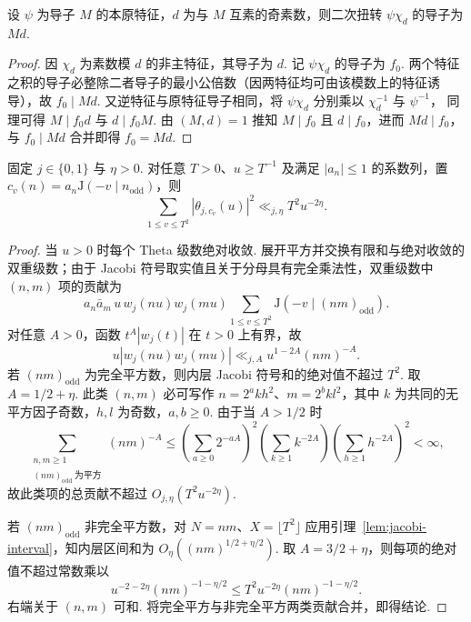 \begin{lemma}[互素导子的本原二次扭转]
\label{lem:twist-primitivity}
\emitthmsource
设 $\psi$ 为导子 $M$ 的本原特征，$d$ 为与 $M$ 互素的奇素数，则二次扭转 $\psi\chi_d$ 的导子为 $Md$.
\end{lemma}
\begin{proof}
因 $\chi_d$ 为素数模 $d$ 的非主特征，其导子为 $d$.
记 $\psi\chi_d$ 的导子为 $f_0$.
两个特征之积的导子必整除二者导子的最小公倍数（因两特征均可由该模数上的特征诱导），故 $f_0\mid Md$.
又逆特征与原特征导子相同，将 $\psi\chi_d$ 分别乘以 $\chi_d^{-1}$ 与 $\psi^{-1}$，
同理可得 $M\mid f_0d$ 与 $d\mid f_0M$.
由 $(M,d)=1$ 推知 $M\mid f_0$ 且 $d\mid f_0$，进而 $Md\mid f_0$，与 $f_0\mid Md$ 合并即得 $f_0=Md$.
\end{proof}

\begin{lemma}
\label{lem:theta-second-moment}
\emitthmsource
固定 $j\in\{0,1\}$ 与 $\eta>0$. 对任意 $T>0$、$u\ge T^{-1}$ 及满足 $|a_n|\le1$ 的系数列，置 $c_v(n)=a_n\mathrm J(-v\mid n_{\mathrm{odd}})$，则
\[
 \sum_{1\le v\le T^2}|\theta_{j,c_v}(u)|^2\ll_{j,\eta} T^2u^{-2\eta}.
\]
\end{lemma}
\begin{proof}
当 $u>0$ 时每个 Theta 级数绝对收敛. 展开平方并交换有限和与绝对收敛的双重级数；由于 Jacobi 符号取实值且关于分母具有完全乘法性，双重级数中 $(n,m)$ 项的贡献为
\[
 a_n\bar a_m\,u\,w_j(nu)w_j(mu)
 \sum_{1\le v\le T^2}\mathrm J(-v\mid(nm)_{\mathrm{odd}}).
\]
对任意 $A>0$，函数 $t^A|w_j(t)|$ 在 $t>0$ 上有界，故
\[
 u|w_j(nu)w_j(mu)|\ll_{j,A} u^{1-2A}(nm)^{-A}.
\]
若 $(nm)_{\mathrm{odd}}$ 为完全平方数，则内层 Jacobi 符号和的绝对值不超过 $T^2$. 取 $A=1/2+\eta$. 此类 $(n,m)$ 必可写作 $n=2^a k h^2$、$m=2^b k l^2$，其中 $k$ 为共同的无平方因子奇数，$h,l$ 为奇数，$a,b\ge0$. 由于当 $A>1/2$ 时
\[
 \sum_{\substack{n,m\ge1\\(nm)_{\mathrm{odd}}\ \text{为平方}}}(nm)^{-A}
 \le\left(\sum_{a\ge0}2^{-aA}\right)^2
     \left(\sum_{k\ge1}k^{-2A}\right)
     \left(\sum_{h\ge1}h^{-2A}\right)^2<\infty,
\]
故此类项的总贡献不超过 $O_{j,\eta}(T^2u^{-2\eta})$.

若 $(nm)_{\mathrm{odd}}$ 非完全平方数，对 $N=nm$、$X=\lfloor T^2\rfloor$ 应用引理~\ref{lem:jacobi-interval}，知内层区间和为 $O_\eta((nm)^{1/2+\eta/2})$. 取 $A=3/2+\eta$，则每项的绝对值不超过常数乘以
\[
 u^{-2-2\eta}(nm)^{-1-\eta/2}
 \le T^2u^{-2\eta}(nm)^{-1-\eta/2}.
\]
右端关于 $(n,m)$ 可和. 将完全平方与非完全平方两类贡献合并，即得结论.
\end{proof}

